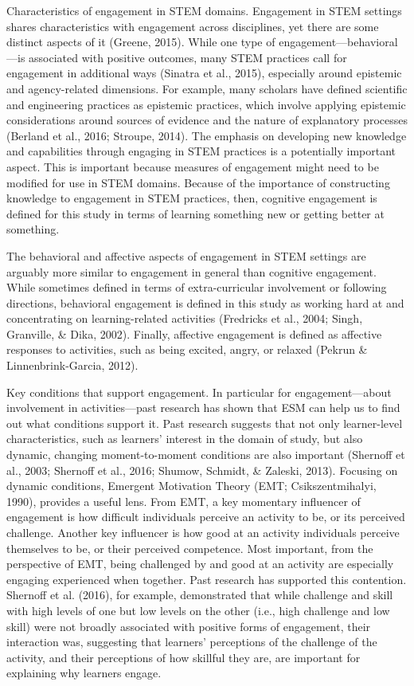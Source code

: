 \documentclass[]{msu-thesis}
\theoremstyle{definition}
\theoremstyle{definition}
\theoremstyle{definition}
\theoremstyle{remark}
\begin{document}
Characteristics of engagement in STEM domains. Engagement in STEM
settings shares characteristics with engagement across disciplines, yet
there are some distinct aspects of it (Greene, 2015). While one type of
engagement---behavioral---is associated with positive outcomes, many
STEM practices call for engagement in additional ways (Sinatra et al.,
2015), especially around epistemic and agency-related dimensions. For
example, many scholars have defined scientific and engineering practices
as epistemic practices, which involve applying epistemic considerations
around sources of evidence and the nature of explanatory processes
(Berland et al., 2016; Stroupe, 2014). The emphasis on developing new
knowledge and capabilities through engaging in STEM practices is a
potentially important aspect. This is important because measures of
engagement might need to be modified for use in STEM domains. Because of
the importance of constructing knowledge to engagement in STEM
practices, then, cognitive engagement is defined for this study in terms
of learning something new or getting better at something.

The behavioral and affective aspects of engagement in STEM settings are
arguably more similar to engagement in general than cognitive
engagement. While sometimes defined in terms of extra-curricular
involvement or following directions, behavioral engagement is defined in
this study as working hard at and concentrating on learning-related
activities (Fredricks et al., 2004; Singh, Granville, \& Dika, 2002).
Finally, affective engagement is defined as affective responses to
activities, such as being excited, angry, or relaxed (Pekrun \&
Linnenbrink-Garcia, 2012).

Key conditions that support engagement. In particular for
engagement---about involvement in activities---past research has shown
that ESM can help us to find out what conditions support it. Past
research suggests that not only learner-level characteristics, such as
learners' interest in the domain of study, but also dynamic, changing
moment-to-moment conditions are also important (Shernoff et al., 2003;
Shernoff et al., 2016; Shumow, Schmidt, \& Zaleski, 2013). Focusing on
dynamic conditions, Emergent Motivation Theory (EMT; Csikszentmihalyi,
1990), provides a useful lens. From EMT, a key momentary influencer of
engagement is how difficult individuals perceive an activity to be, or
its perceived challenge. Another key influencer is how good at an
activity individuals perceive themselves to be, or their perceived
competence. Most important, from the perspective of EMT, being
challenged by and good at an activity are especially engaging
experienced when together. Past research has supported this contention.
Shernoff et al. (2016), for example, demonstrated that while challenge
and skill with high levels of one but low levels on the other (i.e.,
high challenge and low skill) were not broadly associated with positive
forms of engagement, their interaction was, suggesting that learners'
perceptions of the challenge of the activity, and their perceptions of
how skillful they are, are important for explaining why learners engage.
\end{document}
